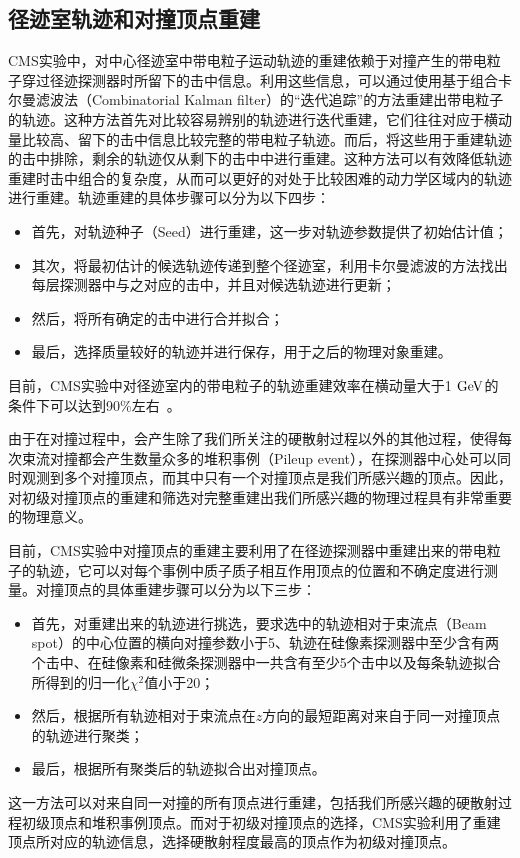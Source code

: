 \subsection{径迹室轨迹和对撞顶点重建}\label{subsec:PVReco}

CMS实验中，对中心径迹室中带电粒子运动轨迹的重建依赖于对撞产生的带电粒子穿过径迹探测器时所留下的击中信息。利用这些信息，可以通过使用基于组合卡尔曼滤波法（Combinatorial Kalman filter）的“迭代追踪”的方法重建出带电粒子的轨迹。这种方法首先对比较容易辨别的轨迹进行迭代重建，它们往往对应于横动量比较高、留下的击中信息比较完整的带电粒子轨迹。而后，将这些用于重建轨迹的击中排除，剩余的轨迹仅从剩下的击中中进行重建。这种方法可以有效降低轨迹重建时击中组合的复杂度，从而可以更好的对处于比较困难的动力学区域内的轨迹进行重建。轨迹重建的具体步骤可以分为以下四步：
\begin{itemize}
    \item 首先，对轨迹种子（Seed）进行重建，这一步对轨迹参数提供了初始估计值；
    \item 其次，将最初估计的候选轨迹传递到整个径迹室，利用卡尔曼滤波的方法找出每层探测器中与之对应的击中，并且对候选轨迹进行更新；
    \item 然后，将所有确定的击中进行合并拟合；
    \item 最后，选择质量较好的轨迹并进行保存，用于之后的物理对象重建。
\end{itemize}
目前，CMS实验中对径迹室内的带电粒子的轨迹重建效率在横动量大于1$\GeV$的条件下可以达到90\%左右~\cite{Elmetenawee:2020emw}。

由于在对撞过程中，会产生除了我们所关注的硬散射过程以外的其他过程，使得每次束流对撞都会产生数量众多的堆积事例（Pileup event），在探测器中心处可以同时观测到多个对撞顶点，而其中只有一个对撞顶点是我们所感兴趣的顶点。因此，对初级对撞顶点的重建和筛选对完整重建出我们所感兴趣的物理过程具有非常重要的物理意义。

目前，CMS实验中对撞顶点的重建主要利用了在径迹探测器中重建出来的带电粒子的轨迹，它可以对每个事例中质子质子相互作用顶点的位置和不确定度进行测量。对撞顶点的具体重建步骤可以分为以下三步：
\begin{itemize}
    \item 首先，对重建出来的轨迹进行挑选，要求选中的轨迹相对于束流点（Beam spot）的中心位置的横向对撞参数小于5、轨迹在硅像素探测器中至少含有两个击中、在硅像素和硅微条探测器中一共含有至少5个击中以及每条轨迹拟合所得到的归一化$\chi^{2}$值小于20；
    \item 然后，根据所有轨迹相对于束流点在$z$方向的最短距离对来自于同一对撞顶点的轨迹进行聚类；
    \item 最后，根据所有聚类后的轨迹拟合出对撞顶点。
\end{itemize}
这一方法可以对来自同一对撞的所有顶点进行重建，包括我们所感兴趣的硬散射过程初级顶点和堆积事例顶点。而对于初级对撞顶点的选择，CMS实验利用了重建顶点所对应的轨迹信息，选择硬散射程度最高的顶点作为初级对撞顶点。

